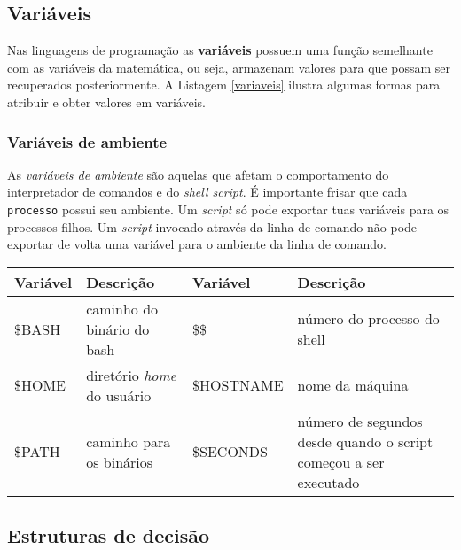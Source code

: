\documentclass[11pt]{article}
\begin{document}
\subsection{Variáveis}

Nas linguagens de programação as \textbf{variáveis} possuem uma função semelhante com as variáveis da matemática, ou seja, armazenam valores para que possam ser recuperados posteriormente. A Listagem \ref{variaveis} ilustra algumas formas para atribuir e obter valores em variáveis.



\newpage

\subsubsection{Variáveis de ambiente}

As \textit{variáveis de ambiente} são aquelas que afetam o comportamento do interpretador de comandos e do \textit{shell script}. É importante frisar que cada \texttt{processo} possui seu ambiente. Um \textit{script} só pode exportar tuas variáveis para os processos filhos. Um \textit{script} invocado através da linha de comando não pode exportar de volta uma variável para o ambiente da linha de comando.

\begin{table}[!htpb]
\begin{center}
\begin{tabular}{|l|p{5cm}|l|p{5cm}|}\hline
\textbf{Variável} & \textbf{Descrição}  & \textbf{Variável} & \textbf{Descrição} \\ \hline \hline 
\$BASH & caminho do binário do bash & \$\$ & número do processo do shell\\ \hline
\$HOME & diretório \textit{home} do usuário & \$HOSTNAME & nome da máquina\\ \hline
\$PATH & caminho para os binários & \$SECONDS & número de segundos desde quando o script começou a ser executado\\ \hline

\end{tabular}
\end{center}
\end{table}


\subsection{Estruturas de decisão}
\end{document}
